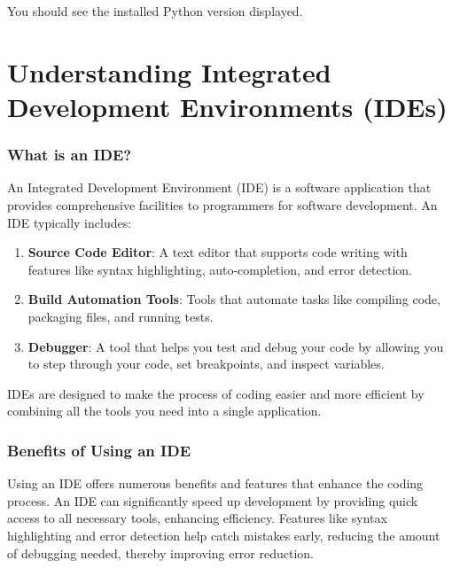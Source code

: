 \documentclass[
  letterpaper,
  DIV=11,
  numbers=noendperiod]{scrreprt}
\providecommand{\tightlist}{%
  \setlength{\itemsep}{0pt}\setlength{\parskip}{0pt}}\usepackage{longtable,booktabs,array}
\begin{document}
You should see the installed Python version displayed.

\hypertarget{understanding-integrated-development-environments-ides}{%
\section{Understanding Integrated Development Environments
(IDEs)}\label{understanding-integrated-development-environments-ides}}

\hypertarget{what-is-an-ide}{%
\subsubsection{What is an IDE?}\label{what-is-an-ide}}

An Integrated Development Environment (IDE) is a software application
that provides comprehensive facilities to programmers for software
development. An IDE typically includes:

\begin{enumerate}
\def\labelenumi{\arabic{enumi}.}
\tightlist
\item
  \textbf{Source Code Editor}: A text editor that supports code writing
  with features like syntax highlighting, auto-completion, and error
  detection.
\item
  \textbf{Build Automation Tools}: Tools that automate tasks like
  compiling code, packaging files, and running tests.
\item
  \textbf{Debugger}: A tool that helps you test and debug your code by
  allowing you to step through your code, set breakpoints, and inspect
  variables.
\end{enumerate}

IDEs are designed to make the process of coding easier and more
efficient by combining all the tools you need into a single application.

\hypertarget{benefits-of-using-an-ide}{%
\subsubsection{Benefits of Using an
IDE}\label{benefits-of-using-an-ide}}

Using an IDE offers numerous benefits and features that enhance the
coding process. An IDE can significantly speed up development by
providing quick access to all necessary tools, enhancing efficiency.
Features like syntax highlighting and error detection help catch
mistakes early, reducing the amount of debugging needed, thereby
improving error reduction.
\end{document}
